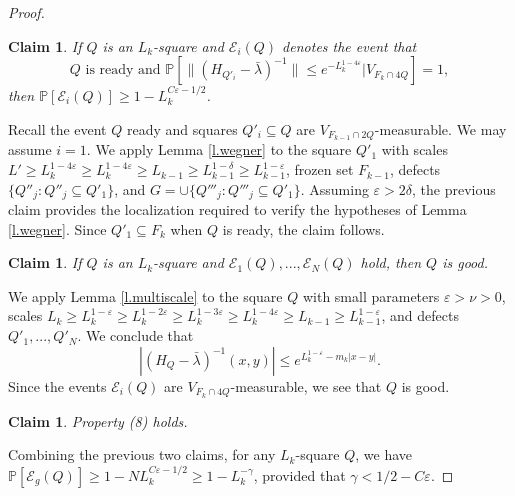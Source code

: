 \documentclass{amsart}
\newtheorem{claim}[equation]{Claim}
\newcommand{\lref}[1]{Lemma \ref{l.#1}}
\numberwithin{equation}{section}
\numberwithin{figure}{section}
\renewcommand{\P}{\mathbb{P}}
\newcommand{\ep}{\varepsilon}
\begin{document}
\begin{proof}
\begin{claim}
If $Q$ is an $L_k$-square and $\mathcal E_i(Q)$ denotes the event that
\begin{equation*}
\mbox{$Q$ is ready and $\P[ \| (H_{Q'_i} - \bar \lambda)^{-1}\| \leq e^{- L_k^{1-4 \ep}} | V_{F_k \cap 4Q}] = 1,$}
\end{equation*}
then $\P[\mathcal E_i(Q)] \geq 1 - L_k^{C \ep - 1/2}$.
\end{claim}

Recall the event $Q$ ready and squares $Q'_i \subseteq Q$ are $V_{F_{k-1} \cap 2Q}$-measurable.  We may assume $i = 1$.  We apply \lref{wegner} to the square $Q'_1$ with scales $L' \geq L_k^{1-4\ep} \geq L_k^{1-4\ep} \geq L_{k-1} \geq L_{k-1}^{1-\delta} \geq L_{k-1}^{1-\ep}$, frozen set $F_{k-1}$, defects $\{ Q''_j : Q''_j \subseteq Q'_1 \}$, and $G = \cup \{ Q'''_j : Q'''_j \subseteq Q'_1 \}$.  Assuming $\ep > 2 \delta$, the previous claim provides the localization required to verify the hypotheses of \lref{wegner}.  Since $Q'_1 \subseteq F_k$ when $Q$ is ready, the claim follows.

\begin{claim}
If $Q$ is an $L_k$-square and $\mathcal E_1(Q), ..., \mathcal E_N(Q)$ hold, then $Q$ is good.
\end{claim}

We apply \lref{multiscale} to the square $Q$ with small parameters $\ep > \nu > 0$, scales $L_k \geq L_k^{1-\ep} \geq L_k^{1-2\ep} \geq L_k^{1-3\ep} \geq L_k^{1-4\ep} \geq L_{k-1} \geq L_{k-1}^{1-\ep}$, and defects $Q'_1, ..., Q'_N$.  We conclude that
\begin{equation*}
|(H_Q - \bar \lambda)^{-1}(x,y)| \leq e^{L_k^{1-\ep} - m_k |x-y|}.
\end{equation*}
Since the events $\mathcal E_i(Q)$ are $V_{F_k \cap 4Q}$-measurable, we see that $Q$ is good.

\begin{claim}
Property (8) holds.
\end{claim}

Combining the previous two claims, for any $L_k$-square $Q$, we have $\P[\mathcal E_g(Q)] \geq 1 - N L_k^{C \ep - 1/2} \geq 1 - L_k^{-\gamma}$, provided that $\gamma < 1/2 - C \ep$.
\end{proof}
\end{document}
